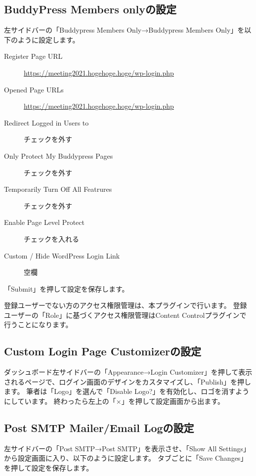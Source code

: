 \documentclass[titlepage,10pt,a4paper,uplatex]{jsbook}
\begin{document}
\subsection{BuddyPress Members onlyの設定}

左サイドバーの「Buddypress Members Only→Buddypress Members Only」を以下のように設定します。

\begin{description}
\item[Register Page URL] \url{https://meeting2021.hogehoge.hoge/wp-login.php}
\item[Opened Page URLs] \url{https://meeting2021.hogehoge.hoge/wp-login.php}
\item[Redirect Logged in Users to] チェックを外す
\item[Only Protect My Buddypress Pages] チェックを外す
\item[Temporarily Turn Off All Featrures] チェックを外す
\item[Enable Page Level Protect] チェックを入れる
\item[Custom / Hide WordPress Login Link] 空欄
\end{description}

「Submit」を押して設定を保存します。

登録ユーザーでない方のアクセス権限管理は、本プラグインで行います。
登録ユーザーの「Role」に基づくアクセス権限管理はContent Controlプラグインで行うことになります。

\subsection{Custom Login Page Customizerの設定}

ダッシュボード左サイドバーの「Appearance→Login Customizer」を押して表示されるページで、ログイン画面のデザインをカスタマイズし、「Publish」を押します。
筆者は「Logo」を選んで「Disable Logo?」を有効化し、ロゴを消すようにしています。
終わったら左上の「×」を押して設定画面から出ます。

\subsection{Post SMTP Mailer/Email Logの設定}

左サイドバーの「Post SMTP→Post SMTP」を表示させ、「Show All Settings」から設定画面に入り、以下のように設定します。
タブごとに「Save Changes」を押して設定を保存します。
\end{document}
